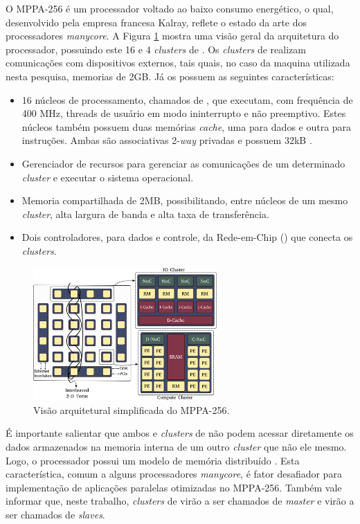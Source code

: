 \documentclass[a4paper,11pt]{article}
\newcommand{\mppa}{MPPA-256\xspace}
\newcommand{\manycore}{\textit{manycore}\xspace}
\begin{document}
O \mppa é um processador voltado ao baixo consumo energético, o qual, desenvolvido pela empresa francesa Kalray, reflete o estado da arte dos processadores \manycore. A Figura \ref{fig:mppaOverview} mostra uma visão geral da arquitetura do processador, possuindo este 16 \ccs e 4 \textit{clusters} de \io. 	Os \textit{clusters} de \io realizam comunicações com dispositivos externos, tais quais, no caso da maquina utilizada nesta pesquisa, memorias \lpddr de 2GB. Já os \ccs possuem as seguintes características:
\begin{itemize}
	\item 16 núcleos de processamento, chamados de \pes, que executam, com frequência de 400 MHz, threads de usuário em modo ininterrupto e não preemptivo. Estes núcleos também possuem duas memórias \textit{cache}, uma para dados e outra para instruções. Ambas são associativas 2-\textit{way} privadas	e possuem 32kB \cite{Podesta2018}.
	\item Gerenciador de recursos para gerenciar as comunicações de um determinado \textit{cluster} e executar o sistema operacional.
	\item Memoria compartilhada de 2MB, possibilitando, entre núcleos de um mesmo \textit{cluster}, alta largura de banda e alta taxa de transferência.
	\item Dois controladores, para dados e controle, da Rede-em-Chip (\noc) que conecta os \textit{clusters}.
\end{itemize}

\begin{figure}[h]
\centering
\includegraphics[width=7cm, keepaspectratio]{figs/mppa-overview.pdf}
\caption{Visão arquitetural simplificada do \mppa \cite{Penna2018}.}\par
\label{fig:mppaOverview}
\end{figure}

É importante salientar que ambos \ccs e \textit{clusters} de \io não podem acessar diretamente os dados armazenados na memoria interna de um outro \textit{cluster} que não ele mesmo. Logo, o processador possui um modelo de memória distribuído \cite{Castro-Souza-CCPE:2016, Podesta2018}. Esta característica, comum a alguns processadores \manycore, é fator desafiador para implementação de aplicações paralelas otimizadas no \mppa \cite{Castro-IA3-JPDC:2014}. Também vale informar que, neste trabalho, \textit{clusters} de \io virão a ser chamados de \textit{master} e \ccs virão a ser chamados de \textit{slaves}.
\end{document}

